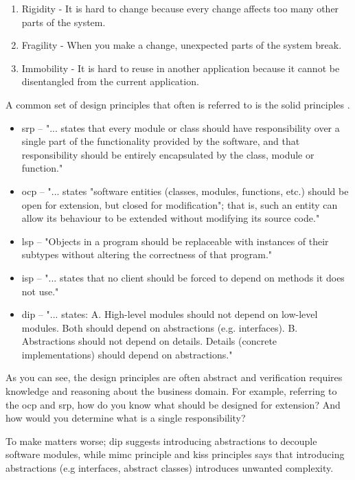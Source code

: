 \documentclass{article}
\begin{document}
\begin{enumerate}
	\item Rigidity - It is hard to change because every change affects too many other parts of the system.
	\item Fragility - When you make a change, unexpected parts of the system break.
	\item Immobility - It is hard to reuse in another application because it cannot be disentangled from the current application.
\end{enumerate}
A common set of design principles that often is referred to is the \gls{solid} principles \cite{solid}.

\begin{itemize}
    \item \gls{srp} -- "... states that every module or class should have responsibility over a single part of the functionality provided by the software, and that responsibility should be entirely encapsulated by the class, module or function." \cite{srp}
    \item \gls{ocp} -- "... states "software entities (classes, modules, functions, etc.) should be open for extension, but closed for modification"; that is, such an entity can allow its behaviour to be extended without modifying its source code." \cite{ocp}
    \item \gls{lsp} -- "Objects in a program should be replaceable with instances of their subtypes without altering the correctness of that program." \cite{lsp}
    \item \gls{isp} -- "... states that no client should be forced to depend on methods it does not use." \cite{isp}
    \item \gls{dip} --  "... states: \newline A. High-level modules should not depend on low-level modules. Both should depend on abstractions (e.g. interfaces). \newline
B. Abstractions should not depend on details. Details (concrete implementations) should depend on abstractions." \cite{dip}
\end{itemize}
    
As you can see, the design principles are often abstract and verification requires knowledge and reasoning about the business domain. For example, referring to the \gls{ocp} and \gls{srp}, how do you know what should be designed for extension? And how would you determine what is a single responsibility? 

To make matters worse; \gls{dip} suggests introducing abstractions to decouple software modules, while \gls{mimc} principle and \gls{kiss} principles says that introducing abstractions (e.g interfaces, abstract classes) introduces unwanted complexity.
\end{document}
